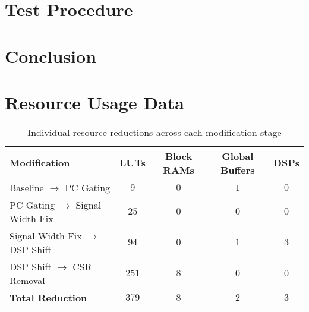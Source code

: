 \documentclass[a4paper,10pt]{article}
\begin{document}
\section{Test Procedure}
\label{sec:Test_Procedure}

\section{Conclusion}
\label{sec:Conclusion}

\newpage
\appendix
\section{Resource Usage Data}

\begin{table}[H] 
    \centering
    \begin{tabularx}{0.85\textwidth}{X c c c c}
        \toprule
        Modification & LUTs & Block RAMs & Global Buffers & DSPs \\ \midrule
        Baseline $\rightarrow$ PC Gating & $9$ & $0$ & $1$ & $0$ \\
        PC Gating $\rightarrow$ Signal Width Fix & $25$ & $0$ & $0$ & $0$ \\
        Signal Width Fix $\rightarrow$ DSP Shift & $94$ & $0$ & $1$ & $3$ \\
        DSP Shift $\rightarrow$ CSR Removal & $251$ & $8$ & $0$ & $0$ \\ \midrule
        \textbf{Total Reduction} & \textbf{$379$} & \textbf{$8$} & \textbf{$2$} & \textbf{$3$} \\
        \bottomrule
    \end{tabularx}
    \caption{Individual resource reductions across each modification stage}
    \label{tab:modification_reductions}
\end{table}
\end{document}
